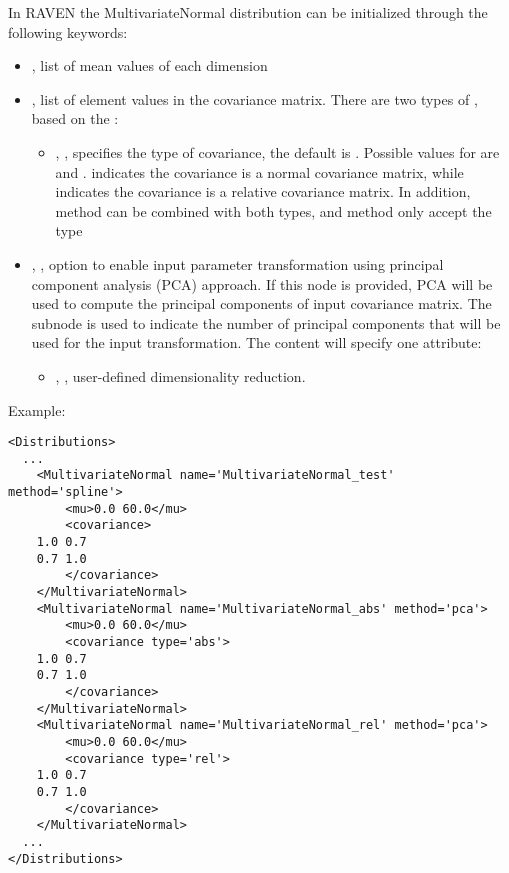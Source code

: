 In RAVEN the MultivariateNormal distribution can be initialized through the following keywords:
\begin{itemize}
  \item {}, list of mean values of each dimension
  \item {}, list of element values in the covariance matrix. There are two types of , based on the :
  \begin{itemize}
    \item {}, , specifies the type of covariance, the default  is . Possible values for  are  and . \nb {} indicates the covariance is a normal covariance matrix, while  indicates the covariance is a relative covariance matrix. In addition, method  can be combined with both types, and method  only accept the type 
  \end{itemize}
  \item {}, , option to enable input parameter transformation using principal component analysis (PCA) approach. If this node is provided, PCA will be used to compute the principal components of input covariance matrix. The subnode  is used to indicate the number of principal components that will be used for the input transformation. The content will specify one attribute:
  \begin{itemize}
    \item {}, , user-defined dimensionality reduction.
  \end{itemize}
\end{itemize}

Example:
\begin{lstlisting}[style=XML]
<Distributions>
  ...
    <MultivariateNormal name='MultivariateNormal_test' method='spline'>
        <mu>0.0 60.0</mu>
        <covariance>
	1.0 0.7
	0.7 1.0
        </covariance>
    </MultivariateNormal>
    <MultivariateNormal name='MultivariateNormal_abs' method='pca'>
        <mu>0.0 60.0</mu>
        <covariance type='abs'>
	1.0 0.7
	0.7 1.0
        </covariance>
    </MultivariateNormal>
    <MultivariateNormal name='MultivariateNormal_rel' method='pca'>
        <mu>0.0 60.0</mu>
        <covariance type='rel'>
	1.0 0.7
	0.7 1.0
        </covariance>
    </MultivariateNormal>
  ...
</Distributions>
\end{lstlisting}

